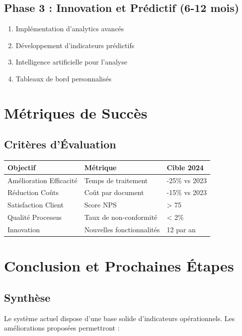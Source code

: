 \documentclass[12pt,a4paper]{article}
\begin{document}
\subsection{Phase 3 : Innovation et Prédictif (6-12 mois)}

\begin{enumerate}
    \item Implémentation d'analytics avancés
    \item Développement d'indicateurs prédictifs
    \item Intelligence artificielle pour l'analyse
    \item Tableaux de bord personnalisés
\end{enumerate}

\section{Métriques de Succès}

\subsection{Critères d'Évaluation}

\begin{longtable}{|p{4cm}|p{3cm}|p{6cm}|}
\hline
\rowcolor{lightgray}
\textbf{Objectif} & \textbf{Métrique} & \textbf{Cible 2024} \\
\hline
\endhead

Amélioration Efficacité & Temps de traitement & -25\% vs 2023 \\
\hline
Réduction Coûts & Coût par document & -15\% vs 2023 \\
\hline
Satisfaction Client & Score NPS & > 75 \\
\hline
Qualité Processus & Taux de non-conformité & < 2\% \\
\hline
Innovation & Nouvelles fonctionnalités & 12 par an \\
\hline
\end{longtable}

\section{Conclusion et Prochaines Étapes}

\subsection{Synthèse}

Le système actuel dispose d'une base solide d'indicateurs opérationnels. Les améliorations proposées permettront :
\end{document}
